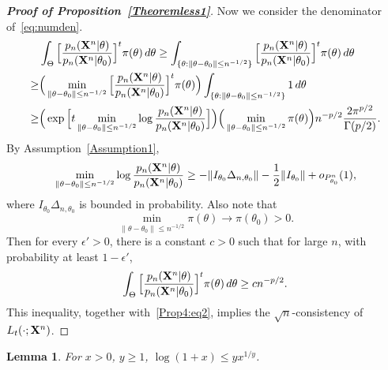 \documentclass[11pt]{article}
\theoremstyle{plain}
\newtheorem{lemma}{\quad\quad Lemma}
\theoremstyle{definition}
\theoremstyle{remark}
\begin{document}
\begin{appendices}
\begin{proof}[\textbf{Proof of Proposition~\ref{Theoremless1}}]
    Now we consider the denominator of~\eqref{eq:numden}.
    $$
    \begin{aligned}
        & \int_{\Theta}\Big[\frac{p_n(\mathbf{X}^{n}|\theta)}{p_n(\mathbf{X}^{n}|\theta_0)}\Big]^{t} \pi(\theta)\, d\theta
        \geq
        \int_{\{\theta:\|\theta-\theta_0\|\leq n^{-1/2}\}}\Big[\frac{p_n(\mathbf{X}^{n}|\theta)}{p_n(\mathbf{X}^{n}|\theta_0)}\Big]^{t} \pi(\theta)\, d\theta
        \\
        \geq &
        \Big(
        \min_{\|\theta-\theta_0\|\leq n^{-1/2}} 
\Big[\frac{p_n(\mathbf{X}^{n}|\theta)}{p_n(\mathbf{X}^{n}|\theta_0)}\Big]^{t} \pi(\theta)
        \Big)
        \int_{\{\theta:\|\theta-\theta_0\|\leq n^{-1/2}\}}1\, d\theta\\
        \geq&
        \Big(
        \exp
\Big[
        t\min_{\|\theta-\theta_0\|\leq n^{-1/2}} 
        \log\frac{p_n(\mathbf{X}^{n}|\theta)}{p_n(\mathbf{X}^{n}|\theta_0)}
        \Big]
        \Big)
        \Big(\min_{\|\theta-\theta_0\|\leq n^{-1/2}} 
        \pi(\theta)
        \Big)
        n^{-p/2}\frac{2\pi^{p/2}}{\Gamma(p/2)}.
    \end{aligned}
    $$
    By Assumption~\ref{Assumption1},
    $$
   \begin{aligned} 
        \min_{\|\theta-\theta_0\|\leq n^{-1/2}} 
        \log\frac{p_n(\mathbf{X}^{n}|\theta)}{p_n(\mathbf{X}^{n}|\theta_0)}
        \geq
        -\|I_{\theta_0}\Delta_{n,\theta_0}\|-\frac{1}{2}\|I_{\theta_0}\|+
        o_{P^n_{\theta_0}}(1),
   \end{aligned}
    $$
    where
    $I_{\theta_0}\Delta_{n,\theta_0}$
    is bounded in probability.
    Also note that 
    $$\min_{\|\theta-\theta_0\|\leq n^{-1/2}} \pi(\theta)\to \pi(\theta_0)>0.$$
    Then for every $\epsilon'>0$, there is a constant $c>0$ such that for large $n$, with probability at least $1-\epsilon'$,
    $$
         \int_{\Theta}\Big[\frac{p_n(\mathbf{X}^{n}|\theta)}{p_n(\mathbf{X}^{n}|\theta_0)}\Big]^{t} \pi(\theta)\, d\theta\geq c n^{-p/2}.
    $$
    This inequality, together with~\eqref{Prop4:eq2}, implies the $\sqrt{n}$-consistency of $L_t(\cdot;\mathbf{X}^{n})$.





\end{proof}

\begin{lemma}
    For $x>0$, $y\geq 1$, $\log (1+ x) \leq  y x^{1/y}$.
\end{lemma}


\end{appendices}
\end{document}
